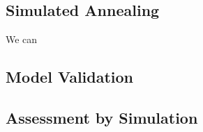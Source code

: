 	

	\subsection{Simulated Annealing}
	\label{ssec:model-selec}
	
		We can 

		
	\subsection{Model Validation}
	\label{ssec:model-validation}
	
	
	
	\subsection{Assessment by Simulation}
	\label{ssec:simulation}
	
		
		
